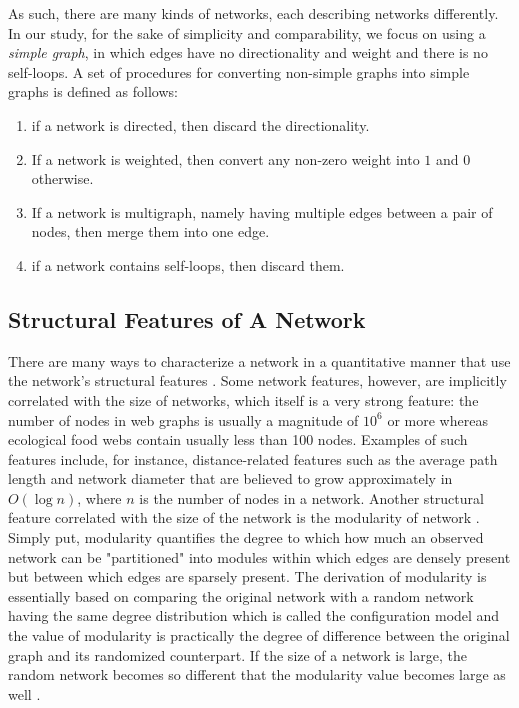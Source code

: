\documentclass{article}
\begin{document}
	As such, there are many kinds of networks, each describing networks differently. In our study, for the sake of simplicity and comparability, we focus on using a \textit{simple graph}, in which edges have no directionality and weight and there is no self-loops. A set of procedures for converting non-simple graphs into simple graphs is defined as follows:
	
	\begin{enumerate}
		\item if a network is directed, then discard the directionality.
		\item If a network is weighted, then convert any non-zero weight into $1$ and $0$ otherwise.
		\item If a network is multigraph, namely having multiple edges between a pair of nodes, then merge them into one edge.
		\item if a network contains self-loops, then discard them.
	\end{enumerate}
	
	\subsection{Structural Features of A Network}
	There are many ways to characterize a network in a quantitative manner that use the network's structural features \cite{Newman:NetworksIntro,NetworkCharacterizationSurvey}. Some network features, however, are implicitly correlated with the size of networks, which itself is a very strong feature: the number of nodes in web graphs is usually a magnitude of $10^6$ or more whereas ecological food webs contain usually less than 100 nodes. Examples of such features include, for instance, distance-related features such as the average path length and network diameter that are believed to grow approximately in $O(\log n)$, where $n$ is the number of nodes in a network. Another structural feature correlated with the size of the network is the modularity of network \cite{Modularity1}. Simply put, modularity quantifies the degree to which how much an observed network can be "partitioned" into modules within which edges are densely present but between which edges are sparsely present. The derivation of modularity is essentially based on comparing the original network with a random network having the same degree distribution which is called the configuration model and the value of modularity is practically the degree of difference between the original graph and its randomized counterpart. If the size of a network is large, the random network becomes so different that the modularity value becomes large as well \cite{ResolutionLimit, ModularityLimit}.
	
\end{document}
